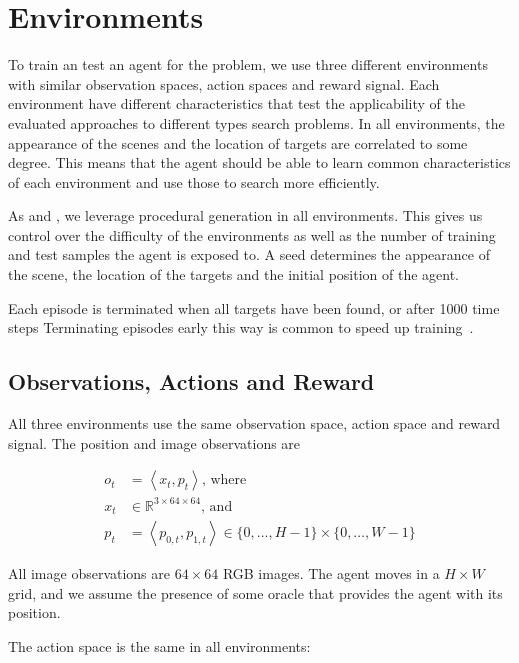 \section{Environments}
\label{sec:environments}

To train an test an agent for the problem, we use three different environments with similar observation spaces, action spaces and reward signal.
Each environment have different characteristics that test the applicability of the evaluated approaches to different types search problems.
In all environments, the appearance of the scenes and the location of targets are correlated to some degree.
This means that the agent should be able to learn common characteristics of each environment and use those to search more efficiently.

As \cite{cobbe_leveraging_2020} and \cite{mnih_asynchronous_2016}, we leverage procedural generation in all environments.
This gives us control over the difficulty of the environments as well as the number of training and test samples the agent is exposed to.
A seed determines the appearance of the scene, the location of the targets and the initial position of the agent.

Each episode is terminated when all targets have been found, or after 1000 time steps
Terminating episodes early this way is common to speed up training~\cite{pardo_time_2018}.

\subsection{Observations, Actions and Reward}

All three environments use the same observation space, action space and reward signal.
The position and image observations are

\begin{align}
    o_t & = \left\langle x_t, p_t \right\rangle \text{, where} \\
    x_t & \in \mathbb{R}^{3 \times 64 \times 64} \text{, and} \\
    p_t & = \left\langle p_{0,t}, p_{1,t} \right\rangle \in \{0, \dots, H-1\} \times \{0, \dots, W-1\}
\end{align}

All image observations are \(64 \times 64\) RGB images.
The agent moves in a \(H \times W\) grid, and we assume the presence of some oracle that provides the agent with its position.

The action space is the same in all environments:

